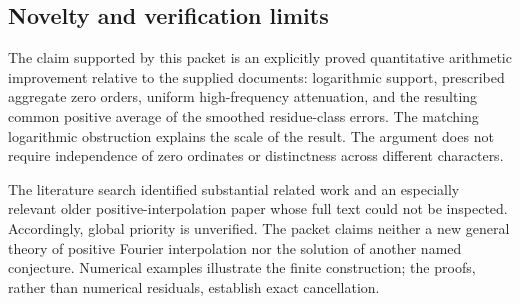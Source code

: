 \subsection{Novelty and verification limits}

The claim supported by this packet is an explicitly proved
quantitative arithmetic improvement relative to the supplied
documents: logarithmic support, prescribed aggregate zero orders,
uniform high-frequency attenuation, and the resulting common
positive average of the smoothed residue-class errors. The
matching logarithmic obstruction explains the scale of the result.
The argument does not require independence of zero ordinates or
distinctness across different characters.

The literature search identified substantial related work and an
especially relevant older positive-interpolation paper whose full
text could not be inspected. Accordingly, global priority is
unverified. The packet claims neither a new general theory of
positive Fourier interpolation nor the solution of another named
conjecture. Numerical examples illustrate the finite construction;
the proofs, rather than numerical residuals, establish exact
cancellation.
